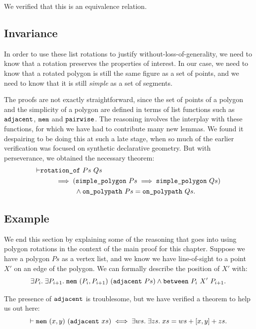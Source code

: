 We verified that this is an equivalence relation.

\subsection{Invariance}
In order to use these list rotations to justify without-loss-of-generality, we need to know that a rotation preserves the properties of interest. In our case, we need to know that a rotated polygon is still the same figure as a set of points, and we need to know that it is still \emph{simple} as a set of segments. 

The proofs are not exactly straightforward, since the set of points of a polygon and the simplicity of a polygon are defined in terms of list functions such as $\texttt{adjacent}$, $\texttt{mem}$ and $\texttt{pairwise}$. The reasoning involves the interplay with these functions, for which we have had to contribute many new lemmas. We found it despairing to be doing this at such a late stage, when so much of the earlier verification was focused on synthetic declarative geometry. But with perseverance, we obtained the necessary theorem:
\begin{equation}\label{eq:PolygonRotateInvariant}
\begin{aligned}
\vdash      &\texttt{rotation\_of}\ Ps\ Qs\\
    &\qquad\implies (\texttt{simple\_polygon}\ Ps \implies \texttt{simple\_polygon}\ Qs)\\
    &\qquad\qquad\quad\wedge \texttt{on\_polypath}\ Ps = \texttt{on\_polypath}\ Qs.
  \end{aligned}
\end{equation}

\subsection{Example}
We end this section by explaining some of the reasoning that goes into using polygon rotations in the context of the main proof for this chapter. Suppose we have a polygon $Ps$ as a vertex list, and we know we have line-of-sight to a point $X'$ on an edge of the polygon. We can formally describe the position of $X'$ with:
\begin{displaymath}
  \exists P_i.\;\exists P_{i+1}.\; \texttt{mem}\ (P_i,P_{i+1})\ (\texttt{adjacent}\ Ps) \wedge \texttt{between}\ P_i\ X'\ P_{i+1}.
\end{displaymath}

The presence of $\texttt{adjacent}$ is troublesome, but we have verified a theorem to help us out here:
\begin{equation*}
\vdash  \texttt{mem}\ (x,y)\ (\texttt{adjacent}\ xs) \iff 
\exists ws.\;\exists zs.\; xs = ws + [x,y] + zs.
\end{equation*}

